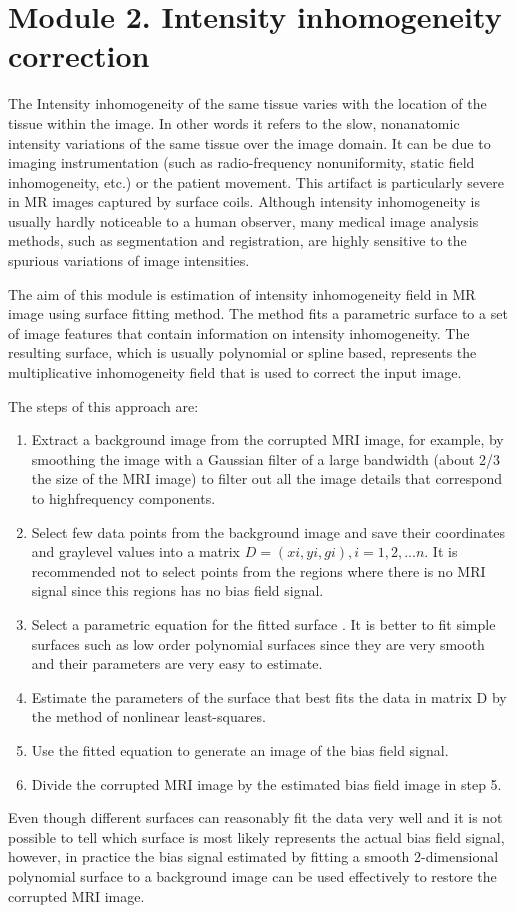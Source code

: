 \section{Module 2. Intensity inhomogeneity correction}

The Intensity inhomogeneity of the same tissue varies with the location
of the tissue within the image. In other words it refers to the slow,
nonanatomic intensity variations of the same tissue over the image
domain. It can be due to imaging instrumentation (such as radio-frequency
nonuniformity, static field inhomogeneity, etc.) or the patient movement.
This artifact is particularly severe in MR images captured by surface
coils. Although intensity inhomogeneity is usually hardly noticeable
to a human observer, many medical image analysis methods, such as
segmentation and registration, are highly sensitive to the spurious
variations of image intensities.

The aim of this module is estimation of intensity inhomogeneity field in MR image using surface fitting method. The method fits a parametric surface to a set of image features that contain information on intensity inhomogeneity. The resulting surface, which is usually polynomial or spline based, represents the multiplicative inhomogeneity field that is used to correct the input image.

The steps of this approach are: 
\begin{enumerate}
\item {Extract a background image from the corrupted MRI image, for example, by smoothing the image with a Gaussian filter of a large bandwidth (about 2/3 the size of the MRI image) to filter out all the image details that correspond to highfrequency components.}
\item {Select few data points from the background image and save their coordinates and graylevel values into a matrix $D = (xi , yi , gi), i = 1, 2, ...n$. It is recommended not to select points from the regions where there is no MRI signal since this regions has no bias field signal.}
\item {Select a parametric equation for the fitted surface . It is better to fit simple surfaces such as low order polynomial surfaces since they are very smooth and their parameters are very easy to estimate.}
\item {Estimate the parameters of the surface that best fits the data in matrix D by the method of nonlinear least-squares.}
\item {Use the fitted equation to generate an image of the bias field signal.}
\item {Divide the corrupted MRI image by the estimated bias field image in step 5.} 
\end{enumerate}
Even though different surfaces can reasonably fit the data very well and it is not possible to tell which surface is most likely represents the actual bias field signal, however, in practice the bias signal estimated by fitting a smooth 2-dimensional polynomial surface to a background image can be used effectively to restore the corrupted MRI image.

